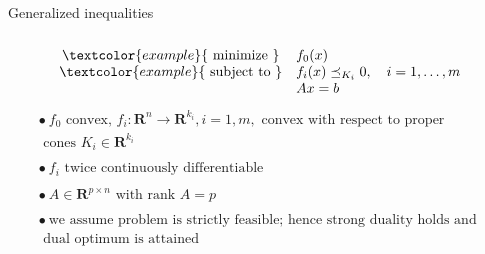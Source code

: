 \documentclass{beamer}
\begin{document}
\begin{frame}[noframenumbering]{Generalized inequalities}
\begin{equation*}  
\begin{array}{cl}\\ \textcolor{example}{\text { minimize }} & {f_{0}(x)} \\ \textcolor{example}{\text { subject to }} & {f_{i}(x) \preceq_{K_{i}} 0, \quad i=1, \ldots, m} \\ {} & {A x=b}\end{array}
\end{equation*}
\begin{equation*}
\begin{array}{l}{ \bullet \ f_{0} \text { convex, } f_{i}: \mathbf{R}^{n} \rightarrow \mathbf{R}^{k_{i}}, i=1, m, \text { convex with respect to proper }} \\ {\text { cones } K_{i} \in \mathbf{R}^{k_{i}}} \\\\ {\bullet \ f_{i} \text { twice continuously differentiable }} \\\\ {\bullet \ A \in \mathbf{R}^{p \times n} \text { with rank } A=p} \\\\ {\bullet\  \text {we assume problem is strictly feasible; hence strong duality holds and }} \\ {\text { dual optimum is attained }}\end{array}
\end{equation*}
\end{frame}
\end{document}
